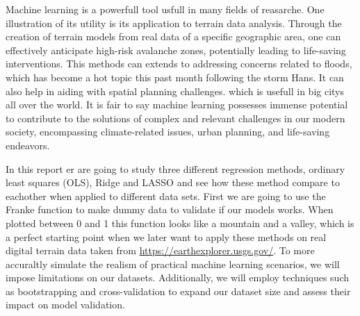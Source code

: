 \thispagestyle{plain}
\noindent Machine learning is a powerfull tool usfull in many fields of reasarche. 
One illustration of its utility is its application to terrain data analysis.
Through the creation of terrain models from real data of a specific geographic area, 
one can effectively anticipate high-risk avalanche zones\cite{WEN2022103535}, 
potentially leading to life-saving interventions. 
This methods can extends to addressing concerns related to floods, which has become 
a hot topic this past month following the storm Hans. It can also help
in aiding with spatial planning challenges. which is 
usefull in big citys all over the world. It is fair to say machine learning possesses immense potential 
to contribute to the solutions of complex and relevant challenges 
in our modern society, encompassing climate-related issues, urban planning, 
and life-saving endeavors. \newline

\noindent In this report er are going to study three different 
regression methods, ordinary least squares (OLS), 
Ridge and LASSO and see how these method compare to eachother when applied 
to different data sets. 
First we are going to use the Franke function to make dummy data to validate if 
our models works. When plotted between 0 and 1 this function looks like a mountain and a valley,
which is a perfect starting point when we later want to apply these methods 
on real digital terrain data taken from \url{https://earthexplorer.usgs.gov/}.
To more accuraltly simulate the realism of practical machine learning scenarios, 
we will impose limitations on our datasets. Additionally, we will employ
techniques such as bootstrapping and cross-validation to expand our dataset
size and assess their impact on model validation.
